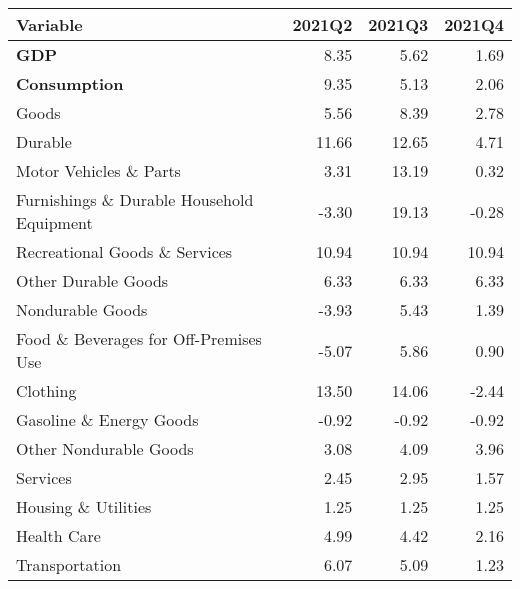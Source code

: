 \documentclass[11pt, letterpaper]{article}\usepackage[]{graphicx}\usepackage[]{color}
\begin{document}
\begin{table}[H]
\centering
\begingroup\fontsize{10pt}{12pt}\selectfont
\begin{tabular}{lrrr}
  \hline
Variable & 2021Q2 & 2021Q3 & 2021Q4 \\ 
  \hline
\hspace{0mm} \textbf{GDP} & 8.35 & 5.62 & 1.69 \\ 
  \hspace{0mm} \textbf{Consumption} & 9.35 & 5.13 & 2.06 \\ 
  \hspace{8mm}  Goods & 5.56 & 8.39 & 2.78 \\ 
  \hspace{16mm}  Durable & 11.66 & 12.65 & 4.71 \\ 
  \hspace{24mm}  Motor Vehicles \& Parts & 3.31 & 13.19 & 0.32 \\ 
  \hspace{24mm}  Furnishings \& Durable Household Equipment & -3.30 & 19.13 & -0.28 \\ 
  \hspace{24mm}  Recreational Goods \& Services & 10.94 & 10.94 & 10.94 \\ 
  \hspace{24mm}  Other Durable Goods & 6.33 & 6.33 & 6.33 \\ 
  \hspace{16mm}  Nondurable Goods & -3.93 & 5.43 & 1.39 \\ 
  \hspace{24mm}  Food \& Beverages for Off-Premises Use & -5.07 & 5.86 & 0.90 \\ 
  \hspace{24mm}  Clothing & 13.50 & 14.06 & -2.44 \\ 
  \hspace{24mm}  Gasoline \& Energy Goods & -0.92 & -0.92 & -0.92 \\ 
  \hspace{24mm}  Other Nondurable Goods & 3.08 & 4.09 & 3.96 \\ 
  \hspace{8mm}  Services & 2.45 & 2.95 & 1.57 \\ 
  \hspace{16mm}  Housing \& Utilities & 1.25 & 1.25 & 1.25 \\ 
  \hspace{16mm}  Health Care & 4.99 & 4.42 & 2.16 \\ 
  \hspace{16mm}  Transportation & 6.07 & 5.09 & 1.23 \\ 

\end{tabular}
\end{table}
\end{document}
